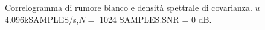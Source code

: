 Correlogramma di rumore bianco e densità spettrale di covarianza. $
u$ 4.096kSAMPLES/s,$N=$ 1024 SAMPLES.SNR = 0 dB.